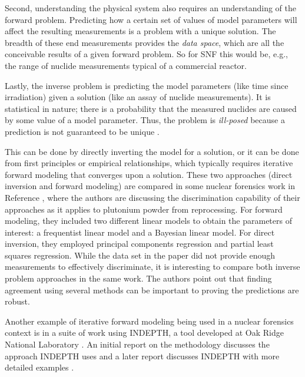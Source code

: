 Second, understanding the physical system also requires an understanding of the
forward problem. Predicting how a certain set of values of model parameters
will affect the resulting measurements is a problem with a unique solution.
The breadth of these end measurements provides the \textit{data space}, which
are all the conceivable results of a given forward problem. So for \gls{SNF}
this would be, e.g., the range of nuclide measurements typical of a commercial
reactor. 

Lastly, the inverse problem is predicting the model parameters (like time since
irradiation) given a solution (like an assay of nuclide measurements).  It is
statistical in nature; there is a probability that the measured nuclides are
caused by some value of a model parameter. Thus, the problem is
\textit{ill-posed} because a prediction is not guaranteed to be unique
\cite{skutnik_2016}. 

This can be done by directly inverting the model for a solution, or it can be
done from first principles or empirical relationships, which typically requires
iterative forward modeling that converges upon a solution. These two approaches
(direct inversion and forward modeling) are compared in some nuclear forensics
work in Reference \cite{inverse_compare}, where the authors are discussing the
discrimination capability of their approaches as it applies to plutonium powder
from reprocessing.  For forward modeling, they included two different linear
models to obtain the parameters of interest: a frequentist linear model and a
Bayesian linear model. For direct inversion, they employed principal components
regression and partial least squares regression. While the data set in the
paper did not provide enough measurements to effectively discriminate, it is
interesting to compare both inverse problem approaches in the same work. The
authors point out that finding agreement using several methods can be important
to proving the predictions are robust. 

Another example of iterative forward modeling being used in a nuclear forensics
context is in a suite of work using \gls{INDEPTH}, a tool developed at Oak
Ridge National Laboratory \cite{grogan_sensitivity1, grogan_sensitivity2,
grogan_indepth_2018, weber_2006, weber_2010, weber_2011}.  An initial report on
the methodology discusses the approach \gls{INDEPTH} uses \cite{weber_2006} and
a later report discusses \gls{INDEPTH} with more detailed examples
\cite{grogan_indepth_2018}.  

